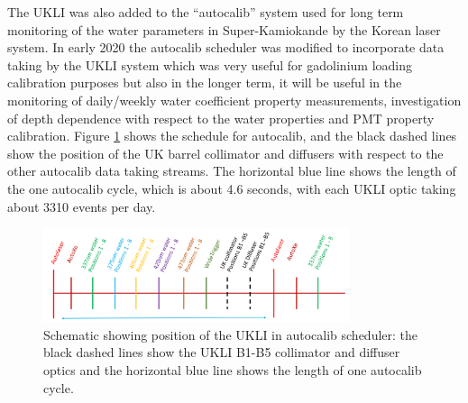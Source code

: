 \begin{figure}
     \par
    
\end{figure}

The UKLI was also added to the ``autocalib'' system used for long term monitoring of the water parameters in Super-Kamiokande by the Korean laser system. In early 2020 the autocalib scheduler was modified to incorporate data taking by the UKLI system which was very useful for gadolinium loading calibration purposes but also in the longer term, it will be useful in the monitoring of daily/weekly water coefficient property measurements, investigation of depth dependence with respect to the water properties and PMT property calibration. Figure \ref{fig:autocalib} shows the schedule for autocalib, and the black dashed lines show the position of the UK barrel collimator and diffusers with respect to the other autocalib data taking streams. The horizontal blue line shows the length of the one autocalib cycle, which is about 4.6 seconds, with each UKLI optic taking about 3310 events per day. 

\begin{figure}
    \centering
    \includegraphics[width=0.8\textwidth]{Figures/autocalib.png}
    \caption{Schematic showing position of the UKLI in autocalib scheduler: the black dashed lines show the UKLI B1-B5 collimator and diffuser optics and the horizontal blue line shows the length of one autocalib cycle.}
    \label{fig:autocalib}
\end{figure}

